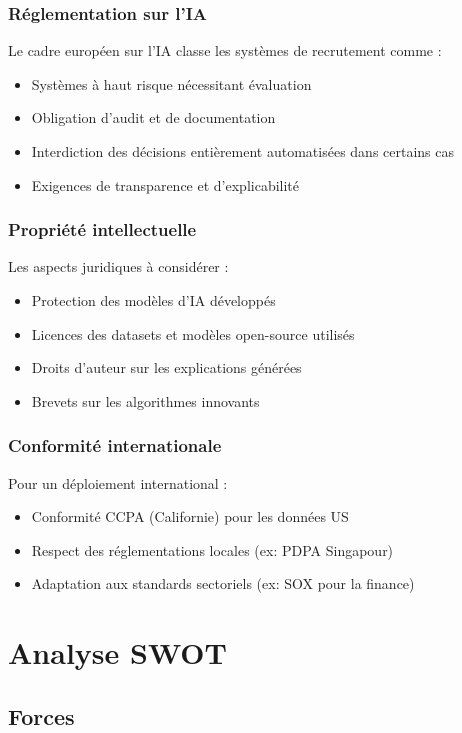 \documentclass[12pt,a4paper]{report}
\begin{document}
\subsubsection{Réglementation sur l'IA}

Le cadre européen sur l'IA classe les systèmes de recrutement comme :
\begin{itemize}
\item Systèmes à haut risque nécessitant évaluation
\item Obligation d'audit et de documentation
\item Interdiction des décisions entièrement automatisées dans certains cas
\item Exigences de transparence et d'explicabilité
\end{itemize}

\subsubsection{Propriété intellectuelle}

Les aspects juridiques à considérer :
\begin{itemize}
\item Protection des modèles d'IA développés
\item Licences des datasets et modèles open-source utilisés
\item Droits d'auteur sur les explications générées
\item Brevets sur les algorithmes innovants
\end{itemize}

\subsubsection{Conformité internationale}

Pour un déploiement international :
\begin{itemize}
\item Conformité CCPA (Californie) pour les données US
\item Respect des réglementations locales (ex: PDPA Singapour)
\item Adaptation aux standards sectoriels (ex: SOX pour la finance)
\end{itemize}

\section{Analyse SWOT}

\subsection{Forces}
\end{document}
